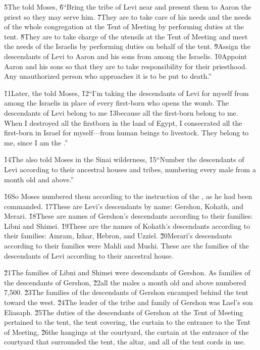 \v{5}The  told Moses, \v{6}``Bring the tribe of Levi near and present them to Aaron the priest so they may serve him. \v{7}They are to take care of his needs and the needs of the whole congregation at the Tent of Meeting by performing duties at the tent. \v{8}They are to take charge of the utensils at the Tent of Meeting and meet the needs of the Israelis by performing duties on behalf of the tent. \v{9}Assign the descendants of Levi to Aaron and his sons from among the Israelis. \v{10}Appoint Aaron and his sons so that they are to take responsibility for their priesthood. Any unauthorized person who approaches it is to be put to death.''

\v{11}Later, the  told Moses, \v{12}``I'm taking the descendants of Levi for myself from among the Israelis in place of every first-born who opens the womb. The descendants of Levi belong to me \v{13}because all the first-born belong to me. When I destroyed all the firstborn in the land of Egypt, I consecrated all the first-born in Israel for myself---from human beings to livestock. They belong to me, since I am the .''

\v{14}The  also told Moses in the Sinai wilderness, \v{15}``Number the descendants of Levi according to their ancestral houses and tribes, numbering every male from a month old and above.''

\v{16}So Moses numbered them according to the instruction of the , as he had been commanded. \v{17}These are Levi's descendants by name: Gershon, Kohath, and Merari. \v{18}These are names of Gershon's descendants according to their families: Libni and Shimei. \v{19}These are the names of Kohath's descendants according to their families: Amram, Izhar, Hebron, and Uzziel. \v{20}Merari's descendants according to their families were Mahli and Mushi. These are the families of the descendants of Levi according to their ancestral house.

\v{21}The families of Libni and Shimei were descendants of Gershon. As families of the descendants of Gershon, \v{22}all the males a month old and above numbered 7,500. \v{23}The families of the descendants of Gershon encamped behind the tent toward the west. \v{24}The leader of the tribe and family of Gershon was Lael's son Eliasaph. \v{25}The duties of the descendants of Gershon at the Tent of Meeting pertained to the tent, the tent covering, the curtain to the entrance to the Tent of Meeting, \v{26}the hangings at the courtyard, the curtain at the entrance of the courtyard that surrounded the tent, the altar, and all of the tent cords in use.

